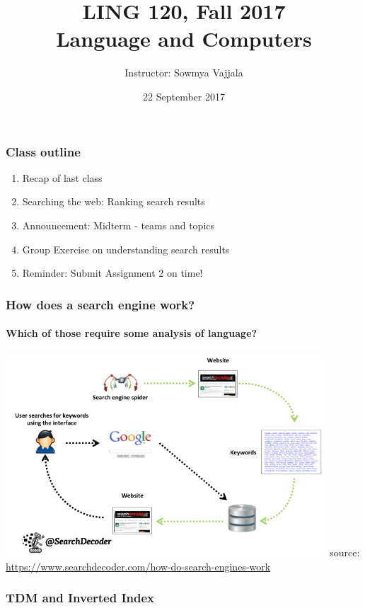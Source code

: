 \documentclass{beamer}
\author[Sowmya Vajjala]{Instructor: Sowmya Vajjala}
\title[LING 120]{LING 120, Fall 2017 \\ Language and Computers}
\date{22 September 2017}
\institute{Iowa State University, USA}
\begin{document}
\begin{frame}\titlepage
\end{frame}

\begin{frame}
\frametitle{Class outline}%
\begin{enumerate}
\item Recap of last class
\item Searching the web: Ranking search results
\item Announcement: Midterm - teams and topics
\item Group Exercise on understanding search results
\item Reminder: Submit Assignment 2 on time!
\end{enumerate}
\end{frame} %

\begin{frame}
\frametitle{How does a search engine work?}
\framesubtitle{Which of those require some analysis of language?}
\includegraphics[width=0.9\textwidth]{search.png}
\medskip \tiny source: \url{https://www.searchdecoder.com/how-do-search-engines-work}
\end{frame}

\begin{frame}
\frametitle{TDM and Inverted Index}
\begin{figure}%
    \centering
    \qquad
    \label{fig:example}%
\end{figure}
\end{frame}
\end{document}
